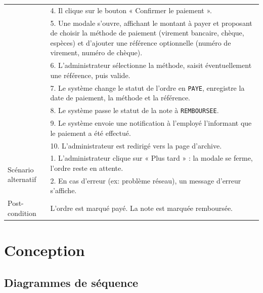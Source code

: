 \documentclass[12pt,a4paper]{report}
\begin{document}
\begin{longtable}{|p{3.5cm}|p{11cm}|}
& 4. Il clique sur le bouton « Confirmer le paiement ». \\

& 5. Une modale s'ouvre, affichant le montant à payer et proposant de choisir la méthode de paiement (virement bancaire, chèque, espèces) et d'ajouter une référence optionnelle (numéro de virement, numéro de chèque). \\

& 6. L'administrateur sélectionne la méthode, saisit éventuellement une référence, puis valide. \\

& 7. Le système change le statut de l'ordre en \texttt{PAYE}, enregistre la date de paiement, la méthode et la référence. \\

& 8. Le système passe le statut de la note à \texttt{REMBOURSEE}. \\

& 9. Le système envoie une notification à l'employé l'informant que le paiement a été effectué. \\

& 10. L'administrateur est redirigé vers la page d'archive. \\

\hline

\multirow{2}{*}{Scénario alternatif} & \multicolumn{1}{|p{11cm}|}{1. L'administrateur clique sur « Plus tard » : la modale se ferme, l'ordre reste en attente.} \\

& \multicolumn{1}{|p{11cm}|}{2. En cas d'erreur (ex: problème réseau), un message d'erreur s'affiche.} \\

\hline

Post-condition & L'ordre est marqué payé. La note est marquée remboursée. \\

\hline

\end{longtable}


\section{Conception}                           

\subsection{Diagrammes de séquence}
\end{document}
